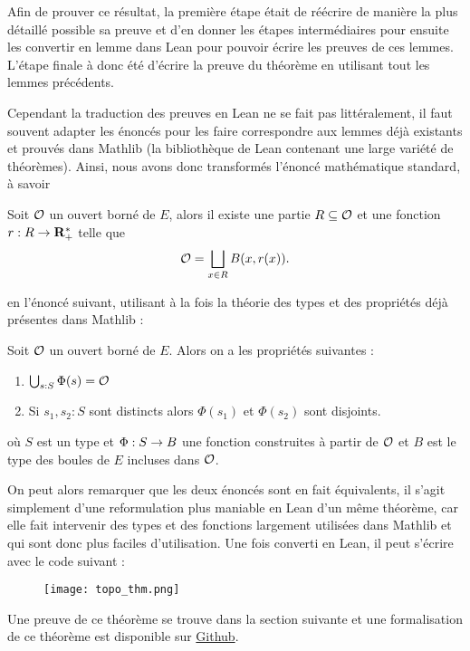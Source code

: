 \documentclass[../../rapport.tex]{subfiles}
\begin{document}
  Afin de prouver ce résultat, la première étape était de réécrire de manière la plus détaillé possible sa preuve et d'en donner
  les étapes intermédiaires pour ensuite les convertir en lemme dans Lean pour pouvoir écrire les preuves de ces lemmes.
  L'étape finale à donc été d'écrire la preuve du théorème en utilisant tout les lemmes précédents.

  Cependant la traduction des preuves en Lean ne se fait pas littéralement, il faut souvent adapter les énoncés pour
  les faire correspondre aux lemmes déjà existants et prouvés dans Mathlib (la bibliothèque de Lean contenant une large variété de théorèmes).
  Ainsi, nous avons donc transformés l'énoncé mathématique standard, à savoir
  \begin{theorem*}
    Soit $\mathcal{O}$ un ouvert borné de $E$, alors il existe une partie $R \subseteq \mathcal{O}$ et une fonction $r : R \rightarrow \mathbf R^*_+$ telle que
    $$\mathcal{O} = \bigsqcup_{x \in R}{B(x, r(x))}.$$
  \end{theorem*}
  en l'énoncé suivant, utilisant à la fois la théorie des types et des propriétés déjà présentes dans Mathlib :

  \begin{theorem*}
    Soit $\mathcal{O}$ un ouvert borné de $E$. Alors on a les propriétés suivantes :
    \begin{enumerate}
      \item $\bigcup_{s : S}{\Phi(s)} = \mathcal{O}$
      \item Si $s_1, s_2 : S$ sont distincts alors $\Phi(s_1)$ et $\Phi(s_2)$ sont disjoints.
    \end{enumerate}
    où $S$ est un type et $\Phi : S \rightarrow B$ une fonction construites à partir de $\mathcal{O}$ et $B$ est le type des boules de $E$ incluses dans $\mathcal{O}$.
  \end{theorem*}

  On peut alors remarquer que les deux énoncés sont en fait équivalents, il s'agit simplement d'une reformulation
  plus maniable en Lean d'un même théorème, car elle fait intervenir des types et des fonctions largement utilisées dans Mathlib
  et qui sont donc plus faciles d'utilisation. Une fois converti en Lean, il peut s'écrire avec le code suivant :

  \begin{figure}[ht]
    \centering
    \texttt{[image: topo\_thm.png]}
  \end{figure}

  Une preuve de ce théorème se trouve dans la section suivante et une formalisation de ce théorème est disponible sur
  \href{https://github.com/daurrian/bowen/blob/main/Bowen/Ultrametric.lean}{Github}.
\end{document}
